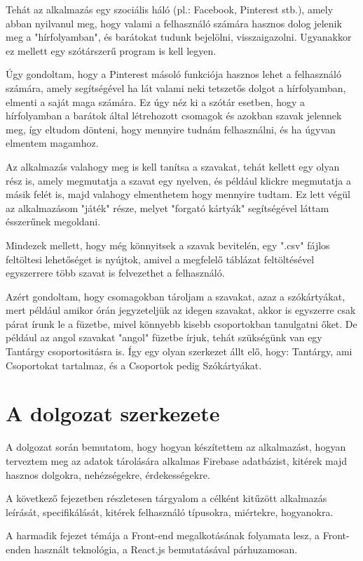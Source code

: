 Tehát az alkalmazás egy szociális háló (pl.: Facebook, Pinterest stb.), amely abban nyilvanul meg, hogy valami a felhasználó számára hasznos dolog jelenik meg a "hírfolyamban", és barátokat tudunk bejelölni, visszaigazolni. Ugyanakkor ez mellett egy szótárszerű program is kell legyen.

Úgy gondoltam, hogy a Pinterest másoló funkciója hasznos lehet a felhasználó számára, amely segítségével ha lát valami neki tetszetős dolgot a hírfolyamban, elmenti a saját maga számára. Ez úgy néz ki a szótár esetben, hogy a hírfolyamban a barátok által létrehozott csomagok és azokban szavak jelennek meg, így eltudom dönteni, hogy mennyire tudnám felhasználni, és ha úgyvan elmentem magamhoz.

Az alkalmazás valahogy meg is kell tanítsa a szavakat, tehát kellett egy olyan rész is, amely megmutatja a szavat egy nyelven, és például klickre megmutatja a másik felét is, majd valahogy elmenthetem hogy mennyire tudtam. Ez lett végül az alkalmazásom "játék" része, melyet "forgató kártyák" segítségével láttam ésszerűnek megoldani. 

Mindezek mellett, hogy még könnyitsek a szavak bevitelén, egy ".csv" fájlos feltöltesi lehetőséget is nyújtok, amivel a megfelelő táblázat feltöltésével egyszerrere több szavat is felvezethet a felhasználó.

Azért gondoltam, hogy csomagokban tároljam a szavakat, azaz a szókártyákat, mert például amikor órán jegyzeteljük az idegen szavakat, akkor is egyszerre csak párat írunk le a füzetbe, mivel könnyebb kisebb csoportokban tanulgatni őket. De például az angol szavakat "angol" füzetbe írjuk, tehát szükségünk van egy Tantárgy csoportositásra is. Így egy olyan szerkezet állt elő, hogy: Tantárgy, ami Csoportokat tartalmaz, és a Csoportok pedig Szókártyákat.
\section{A dolgozat szerkezete}\label{sec:BEVEZET:szerkezet}
A dolgozat során bemutatom, hogy hogyan készítettem az alkalmazást, hogyan terveztem meg az adatok tárolására alkalmas Firebase adatbázist, kitérek majd hasznos dolgokra, nehézségekre, érdekességekre.

A következő fejezetben részletesen tárgyalom a célként kitűzött alkalmazás leírását, specifikálását, kitérek felhasználó típusokra, miértekre, hogyanokra.

A harmadik fejezet témája a Front-end megalkotásának folyamata lesz, a Front-enden használt teknológia, a React.js bemutatásával párhuzamosan.

